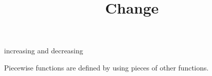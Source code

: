 \documentclass{ximera}
\title{Change}
\begin{document}
increasing and decreasing
\begin{abstract}

\end{abstract}
\maketitle



Piecewise functions are defined by using pieces of other functions.
\end{document}
